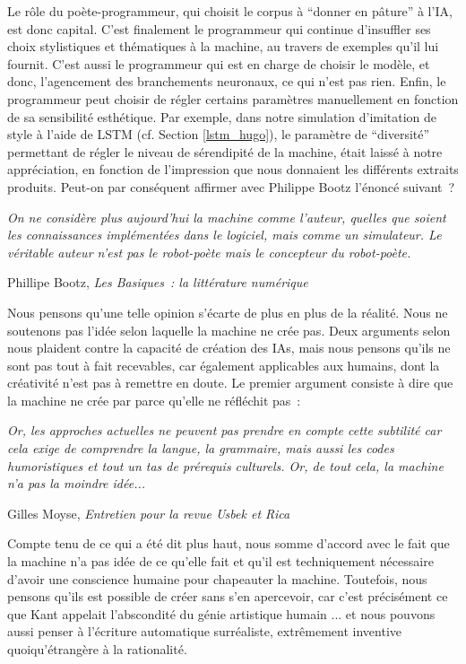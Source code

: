 \documentclass{article}
\newenvironment{citationbox}
{\begin{center}
		\begin{minipage}{.8\textwidth}
		}
		{
		\end{minipage}	
\end{center}
}
\begin{document}
				Le rôle du poète-programmeur, qui choisit le corpus à ``donner en pâture'' à l'IA, est donc capital. C'est finalement le programmeur qui continue d'insuffler ses choix stylistiques et thématiques à la machine, au travers de exemples qu'il lui fournit. C'est aussi le programmeur qui est en charge de choisir le modèle, et donc, l'agencement des branchements neuronaux, ce qui n'est pas rien. Enfin, le programmeur peut choisir de régler certains paramètres manuellement en fonction de sa sensibilité esthétique. Par exemple, dans notre simulation d'imitation de style à l'aide de LSTM (cf. Section \ref{lstm_hugo}), le paramètre de ``diversité'' permettant de régler le niveau de sérendipité de la machine, était laissé à notre appréciation, en fonction de l'impression que nous donnaient les différents extraits produits. Peut-on par conséquent affirmer avec Philippe Bootz l'énoncé suivant~?
				\begin{citationbox}
					\textit{On ne considère plus aujourd’hui la machine comme l’auteur, quelles que soient les connaissances implémentées dans le logiciel, mais comme un simulateur. Le véritable auteur n’est pas le robot-poète mais le concepteur du robot-poète.}
					\begin{flushright}
						Phillipe Bootz, \textit{Les Basiques~: la littérature numérique} \cite{bootz2006}
					\end{flushright}
				\end{citationbox}
				
				Nous pensons qu'une telle opinion s'écarte de plus en plus de la réalité. Nous ne soutenons pas l'idée selon laquelle la machine ne crée pas. Deux arguments selon nous plaident contre la capacité de création des IAs, mais nous pensons qu'ils ne sont pas tout à fait recevables, car également applicables aux humains, dont la créativité n'est pas à remettre en doute. Le premier argument consiste à dire que la machine ne crée par parce qu'elle ne réfléchit pas~:
				\begin{citationbox}
					\textit{Or, les approches actuelles ne peuvent pas prendre en compte cette subtilité car cela exige de comprendre la langue, la grammaire, mais aussi les codes humoristiques et tout un tas de prérequis culturels. Or, de tout cela, la machine n’a pas la moindre idée...}
					\begin{flushright}
						Gilles Moyse, \textit{Entretien pour la revue Usbek et Rica} \cite{edin2018}
					\end{flushright}
				\end{citationbox}
				Compte tenu de ce qui a été dit plus haut, nous somme d'accord avec le fait que la machine n'a pas idée de ce qu'elle fait et qu'il est techniquement nécessaire d'avoir une conscience humaine pour chapeauter la machine. Toutefois, nous pensons qu'ils est possible de créer sans s'en apercevoir, car c'est précisément ce que Kant appelait l'abscondité du génie artistique humain \cite{kant1791}... et nous pouvons aussi penser à l'écriture automatique surréaliste, extrêmement inventive quoiqu'étrangère à la rationalité.\\
				
\end{document}
